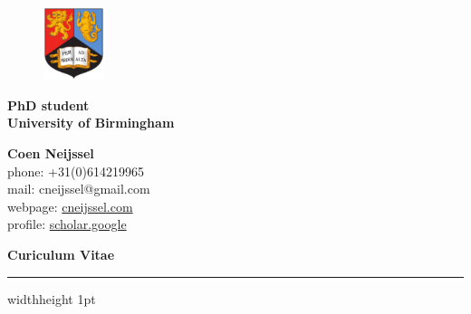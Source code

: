 \documentclass[]{res} %
\begin{document}
\begin{minipage}[ht]{0.78\textwidth}
\vspace{-18pt}
\begin{figure}
\vspace{-18pt}

    \includegraphics[width=0.7in]{BirminghamUniversityCrest.pdf}
\end{figure}
\textbf{PhD student \\
University of Birmingham \\
}
\end{minipage}
\hspace{-20pt}
\begin{minipage}[ht]{0.28\textwidth}
\Large\textbf{Coen Neijssel}\normalsize \\
phone: +31(0)614219965\\
mail: cneijssel@gmail.com\\
webpage: {\color{blue} \href{http://www.cneijssel.com}{cneijssel.com}}\\
profile: {\color{blue} \href{https://scholar.google.com/citations?hl=en&view_op=list_works&gmla=AJsN-F4qhiUM-CTnfkcztQclzMCdlI4Klho8qKf5n6g2txyW89xcNY80F_vT-CVIKH3pq1akJ7WYjbzqrtNsi690ipbzwhE-lQ&user=EO0BkhkAAAAJ}{scholar.google}}
\end{minipage}




\centerline{\Large\bf Curiculum Vitae} %
\centerline{\Large\bf }

{\hrule width\textwidth height 1pt}\smallskip %




\newcommand\VRule{\color{lightgray}\vrule width 1.2pt}
\end{document}
